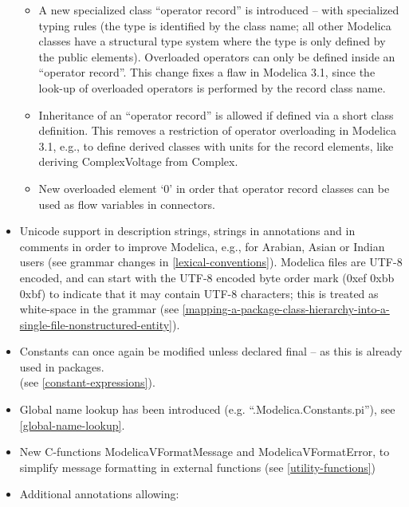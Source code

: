 \begin{itemize}
  \begin{itemize}
  \item
    A new specialized class ``operator record'' is introduced -- with
    specialized typing rules (the type is identified by the class name;
    all other Modelica classes have a structural type system where the
    type is only defined by the public elements). Overloaded operators
    can only be defined inside an ``operator record''. This change fixes
    a flaw in Modelica 3.1, since the look-up of overloaded operators is
    performed by the record class name.
  \item
    Inheritance of an ``operator record'' is allowed if defined via a
    short class definition. This removes a restriction of operator
    overloading in Modelica 3.1, e.g., to define derived classes with
    units for the record elements, like deriving ComplexVoltage from
    Complex.
  \item
    New overloaded element `0' in order that operator record classes can
    be used as flow variables in connectors.
  \end{itemize}
\item
  Unicode support in description strings, strings in annotations and in
  comments in order to improve Modelica, e.g., for Arabian, Asian or
  Indian users (see grammar changes in \autoref{lexical-conventions}). Modelica files are
  UTF-8 encoded, and can start with the UTF-8 encoded byte order mark
  (0xef 0xbb 0xbf) to indicate that it may contain UTF-8 characters;
  this is treated as white-space in the grammar (see \autoref{mapping-a-package-class-hierarchy-into-a-single-file-nonstructured-entity}).
\item
  Constants can once again be modified unless declared final -- as this
  is already used in packages.\\
  (see \autoref{constant-expressions}).
\item
  Global name lookup has been introduced (e.g.
  ``.Modelica.Constants.pi''), see \autoref{global-name-lookup}.
\item
  New C-functions ModelicaVFormatMessage and ModelicaVFormatError, to
  simplify message formatting in external functions (see \autoref{utility-functions})
\item
  Additional annotations allowing:


\end{itemize}
